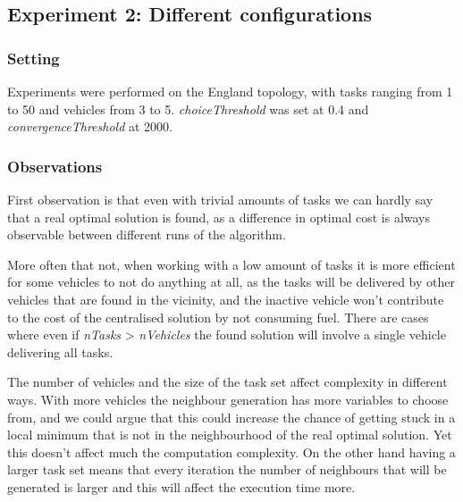 \documentclass[11pt]{article}
\begin{document}
\subsection{Experiment 2: Different configurations}

\subsubsection{Setting}

Experiments were performed on the England topology, with tasks ranging from 1 to 50 and vehicles from 3 to 5. \textit{choiceThreshold} was set at 0.4 and \textit{convergenceThreshold} at 2000.

\subsubsection{Observations}

First observation is that even with trivial amounts of tasks we can hardly say that a real optimal solution is found, as a difference in optimal cost is always observable between different runs of the algorithm.

More often that not, when working with a low amount of tasks it is more efficient for some vehicles to not do anything at all, as the tasks will be delivered by other vehicles that are found in the vicinity, and the inactive vehicle won't contribute to the cost of the centralised solution by not consuming fuel. There are cases where even if \textit{nTasks} > \textit{nVehicles} the found solution will involve a single vehicle delivering all tasks.

The number of vehicles and the size of the task set affect complexity in different ways. With more vehicles the neighbour generation has more variables to choose from, and we could argue that this could increase the chance of getting stuck in a local minimum that is not in the neighbourhood of the real optimal solution. Yet this doesn't affect much the computation complexity. On the other hand having a larger task set means that every iteration the number of neighbours that will be generated is larger and this will affect the execution time more. 
\end{document}
